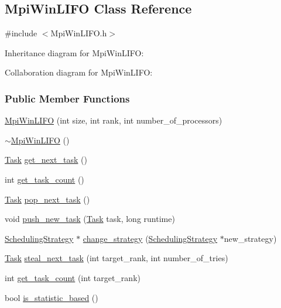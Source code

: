 \hypertarget{a00057}{}\subsection{Mpi\+Win\+L\+I\+F\+O Class Reference}
\label{a00057}


{\ttfamily \#include $<$Mpi\+Win\+L\+I\+F\+O.\+h$>$}



Inheritance diagram for Mpi\+Win\+L\+I\+F\+O\+:


Collaboration diagram for Mpi\+Win\+L\+I\+F\+O\+:
\subsubsection*{Public Member Functions}
\begin{DoxyCompactItemize}
\item 
\hyperlink{a00057_a46a7cbb4d81782b9ff7dbd971e5eb9ca}{Mpi\+Win\+L\+I\+F\+O} (int size, int rank, int number\+\_\+of\+\_\+processors)
\item 
\hyperlink{a00057_a39fbceec3a4fb97990a31ff556ce8ff5}{$\sim$\+Mpi\+Win\+L\+I\+F\+O} ()
\item 
\hyperlink{a00002}{Task} \hyperlink{a00057_a6de2bf8f36458582ebc800f2beda94c6}{get\+\_\+next\+\_\+task} ()
\item 
int \hyperlink{a00057_aeb679863632de7367029fded90eb4e5f}{get\+\_\+task\+\_\+count} ()
\item 
\hyperlink{a00002}{Task} \hyperlink{a00057_a93c2fdd8d75ce1264329edfa48d8864a}{pop\+\_\+next\+\_\+task} ()
\item 
void \hyperlink{a00057_a1336e4abb196dc1f3eba6e7e29f969aa}{push\+\_\+new\+\_\+task} (\hyperlink{a00002}{Task} task, long runtime)
\item 
\hyperlink{a00076}{Scheduling\+Strategy} $\ast$ \hyperlink{a00057_aa33f53bcf71ee26ff20039916cb321cd}{change\+\_\+strategy} (\hyperlink{a00076}{Scheduling\+Strategy} $\ast$new\+\_\+strategy)
\item 
\hyperlink{a00002}{Task} \hyperlink{a00057_a0631b1fc2042f19a5b438c8cfa44934a}{steal\+\_\+next\+\_\+task} (int target\+\_\+rank, int number\+\_\+of\+\_\+tries)
\item 
int \hyperlink{a00057_a4825ff8faf740b1f9e984813c20455ec}{get\+\_\+task\+\_\+count} (int target\+\_\+rank)
\item 
bool \hyperlink{a00057_ae65b1f7b9a7e5c8a2feaceafca0dd129}{is\+\_\+statistic\+\_\+based} ()
\end{DoxyCompactItemize}
